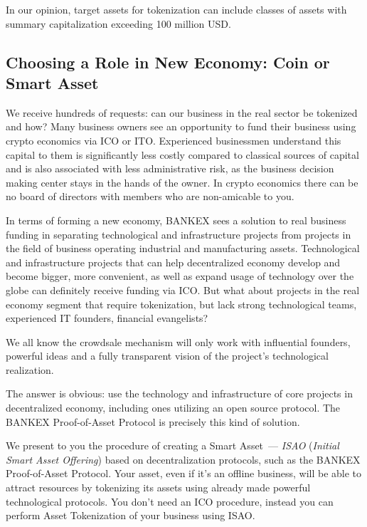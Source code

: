 \documentclass{article}
\begin{document}
\begin{multicols}{2}
In our opinion, target assets for tokenization can include classes of assets with summary capitalization exceeding 100 million USD. 

\subsection{Choosing a Role in New Economy: Coin or Smart Asset}

We receive hundreds of requests: can our business in the real sector be tokenized and how? Many business owners see an opportunity to fund their business using crypto economics via ICO or ITO. Experienced businessmen understand this capital to them is significantly less costly compared to classical sources of capital and is also associated with less administrative risk, as the business decision making center stays in the hands of the owner. In crypto economics there can be no board of directors with members who are non-amicable to you.  

In terms of forming a new economy, BANKEX sees a solution to real business funding in separating technological and infrastructure projects from projects in the field of business operating industrial and manufacturing assets. Technological and infrastructure projects that can help decentralized economy develop and become bigger, more convenient, as well as expand usage of technology over the globe can definitely receive funding via ICO. But what about projects in the real economy segment that require tokenization, but lack strong technological teams, experienced IT founders, financial evangelists?

We all know the crowdsale mechanism will only work with influential founders, powerful ideas and a fully transparent vision of the project’s technological realization.  

The answer is obvious: use the technology and infrastructure of core projects in decentralized economy, including ones utilizing an open source protocol. The BANKEX Proof-of-Asset Protocol is precisely this kind of solution. 

We present to you the procedure of creating a Smart Asset~--- \textit{ISAO} (\textit{Initial Smart Asset Offering}) based on decentralization protocols, such as the BANKEX Proof-of-Asset Protocol. Your asset, even if it’s an offline business, will be able to attract resources by tokenizing its assets using already made powerful technological protocols. You don’t need an ICO procedure, instead you can perform Asset Tokenization of your business using ISAO. 


\end{multicols}
\end{document}
